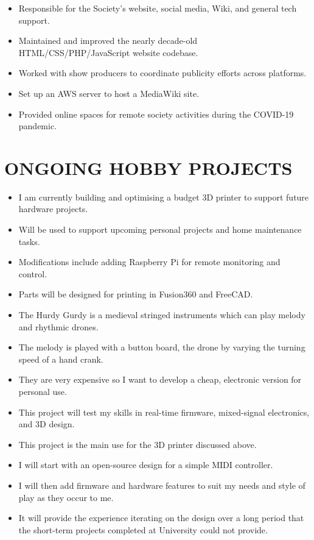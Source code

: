 
{
  {\begin{itemize}
    \item Responsible for the Society's website, social media, Wiki, and general tech support.
    \item Maintained and improved the nearly decade-old HTML/CSS/PHP/JavaScript website codebase.
    \item Worked with show producers to coordinate publicity efforts across platforms.
    \item Set up an AWS server to host a MediaWiki site.
    \item Provided online spaces for remote society activities during the COVID-19 pandemic. 
  \end{itemize}
  }
}

\section{ONGOING HOBBY PROJECTS}

{
  {\begin{itemize}
    \item I am currently building and optimising a budget 3D printer to support future hardware projects. 
    \item Will be used to support upcoming personal projects and home maintenance tasks.
    \item Modifications include adding Raspberry Pi for remote monitoring and control.
    \item Parts will be designed for printing in Fusion360 and FreeCAD.
  \end{itemize}
  }
}

{
  {\begin{itemize}
    \item The Hurdy Gurdy is a medieval stringed instruments which can play melody and rhythmic drones.
    \item The melody is played with a button board, the drone by varying the turning speed of a hand crank.  
    \item They are very expensive so I want to develop a cheap, electronic version for personal use.
    \item This project will test my skills in real-time firmware, mixed-signal electronics, and 3D design. 
    \item This project is the main use for the 3D printer discussed above.
    \item I will start with an open-source design for a simple MIDI controller.
    \item I will then add firmware and hardware features to suit my needs and style of play as they occur to me. 
    \item It will provide the experience iterating on the design over a long period that the short-term projects completed at University could not provide.
  \end{itemize}
  }
}

